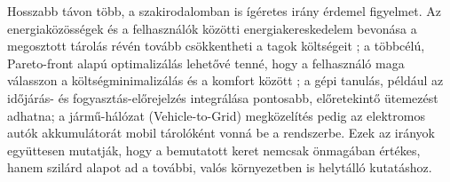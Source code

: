 Hosszabb távon több, a szakirodalomban is ígéretes irány érdemel figyelmet. Az energiaközösségek és a felhasználók közötti energiakereskedelem bevonása a megosztott tárolás révén tovább csökkentheti a tagok költségeit \cite{Lazzari2023}; a többcélú, Pareto-front alapú optimalizálás lehetővé tenné, hogy a felhasználó maga válasszon a költségminimalizálás és a komfort között \cite{Fadaee2012}; a gépi tanulás, például az időjárás- és fogyasztás-előrejelzés integrálása pontosabb, előretekintő ütemezést adhatna; a jármű-hálózat (Vehicle-to-Grid) megközelítés pedig az elektromos autók akkumulátorát mobil tárolóként vonná be a rendszerbe. Ezek az irányok együttesen mutatják, hogy a bemutatott keret nemcsak önmagában értékes, hanem szilárd alapot ad a további, valós környezetben is helytálló kutatáshoz.
